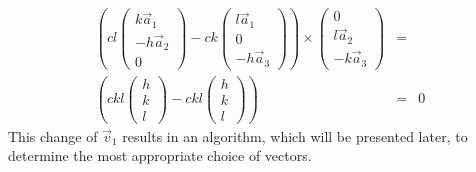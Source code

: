 \documentclass[11pt]{article} %
\begin{document}
\begin{eqnarray}
\left(cl \left( \begin{array}{c} k\vec{a}_1 \\ - h \vec{a}_2 \\ 0 \end{array} \right) - ck\left( \begin{array}{c} l \vec{a}_1 \\ 0 \\ - h \vec{a}_3 \end{array} \right) \right) \times \left( \begin{array}{c} 0 \\ l\vec{a}_2 \\ -k\vec{a}_3 \end{array} \right) & = & \nonumber \\  
 \left( ckl \left( \begin{array}{c} h \\ k \\ l \end{array} \right) - ckl\left( \begin{array}{c} h \\ k \\ l \end{array} \right) \right) &  = & 0
\end{eqnarray}
This change of $\vec{v}_1$ results in an algorithm, which will be presented later, to determine the most appropriate choice of vectors.
\end{document}
